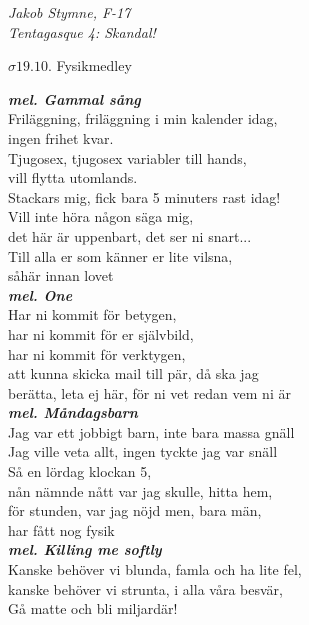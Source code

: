 \documentclass[a6paper,10pt]{article}
\newcommand{\mel}[1]{\small\textbf{\textit{mel. #1 \\}}}
\begin{document}
\begin{flushright}
\textit{Jakob Stymne, F-17\\ Tentagasque 4: Skandal!}
\end{flushright}

\setlength{\oddsidemargin}{-0.47in}
\begin{center}
\Large $\sigma19.10$. Fysikmedley
\end{center}\small 
\mel{Gammal sång}
Friläggning, friläggning i min kalender idag,\\
ingen frihet kvar.\\
Tjugosex, tjugosex variabler till hands,\\
vill flytta utomlands.
\vspace{5pt}\\
Stackars mig, fick bara 5 minuters rast idag!\\
Vill inte höra någon säga mig, \\
det här är uppenbart, det ser ni snart...
\vspace{5pt}\\
Till alla er som känner er lite vilsna,\\
såhär innan lovet
\vspace{5pt}\\
\mel{One}
Har ni kommit för betygen,\\ 
har ni kommit för er självbild,\\
har ni kommit för verktygen, \\
att kunna skicka mail till pär, då ska jag \\
berätta, leta ej här, för ni vet redan vem ni är 
\vspace{5pt}\\
\mel{Måndagsbarn}
Jag var ett jobbigt barn, inte bara massa gnäll\\
Jag ville veta allt, ingen tyckte jag var snäll
\vspace{5pt}\\
Så en lördag klockan 5,\\ 
nån nämnde nått var jag skulle, hitta hem,\\
för stunden, var jag nöjd men, bara män, \\
har fått nog fysik
\vspace{5pt}\\
\mel{Killing me softly}
Kanske behöver vi blunda, famla och ha lite fel,\\
kanske behöver vi strunta, i alla våra besvär,\\
Gå matte och bli miljardär!
\end{document}
